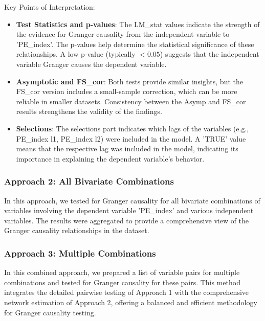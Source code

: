 \documentclass[12pt]{article}
\begin{document}
Key Points of Interpretation:
\begin{itemize}
    \item \textbf{Test Statistics and p-values}: The LM\_stat values indicate the strength of the evidence for Granger causality from the independent variable to 'PE\_index'. The p-values help determine the statistical significance of these relationships. A low p-value (typically $< 0.05$) suggests that the independent variable Granger causes the dependent variable.

    \item \textbf{Asymptotic and FS\_cor}: Both tests provide similar insights, but the FS\_cor version includes a small-sample correction, which can be more reliable in smaller datasets. Consistency between the Asymp and FS\_cor results strengthens the validity of the findings.
    \item \textbf{Selections}: The selections part indicates which lags of the variables (e.g., PE\_index l1, PE\_index l2) were included in the model. A 'TRUE' value means that the respective lag was included in the model, indicating its importance in explaining the dependent variable's behavior.
\end{itemize}

\subsubsection{Approach 2: All Bivariate Combinations}

In this approach, we tested for Granger causality for all bivariate combinations of variables involving the dependent variable 'PE\_index' and various independent variables. The results were aggregated to provide a comprehensive view of the Granger causality relationships in the dataset.

\subsubsection{Approach 3: Multiple Combinations}

In this combined approach, we prepared a list of variable pairs for multiple combinations and tested for Granger causality for these pairs. This method integrates the detailed pairwise testing of Approach 1 with the comprehensive network estimation of Approach 2, offering a balanced and efficient methodology for Granger causality testing.
\end{document}
